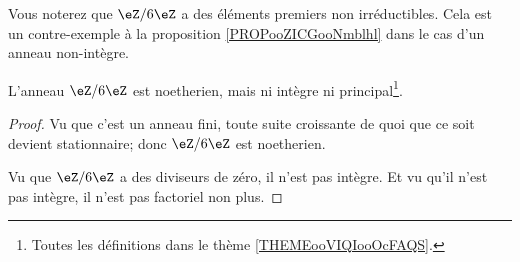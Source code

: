 Vous noterez que \( \eZ/6\eZ\) a des éléments premiers non irréductibles. Cela est un contre-exemple à la proposition \ref{PROPooZICGooNmblhl} dans le cas d'un anneau non-intègre.


\begin{lemma}    \label{LEMooZSELooGOFEIz}
    L'anneau \( \eZ/6\eZ\) est noetherien, mais ni intègre ni principal\footnote{Toutes les définitions dans le thème \ref{THEMEooVIQIooOcFAQS}.}.
\end{lemma}

\begin{proof}
    Vu que c'est un anneau fini, toute suite croissante de quoi que ce soit devient stationnaire; donc \( \eZ/6\eZ\) est noetherien.

    Vu que \( \eZ/6\eZ\) a des diviseurs de zéro, il n'est pas intègre. Et vu qu'il n'est pas intègre, il n'est pas factoriel non plus.
\end{proof}
